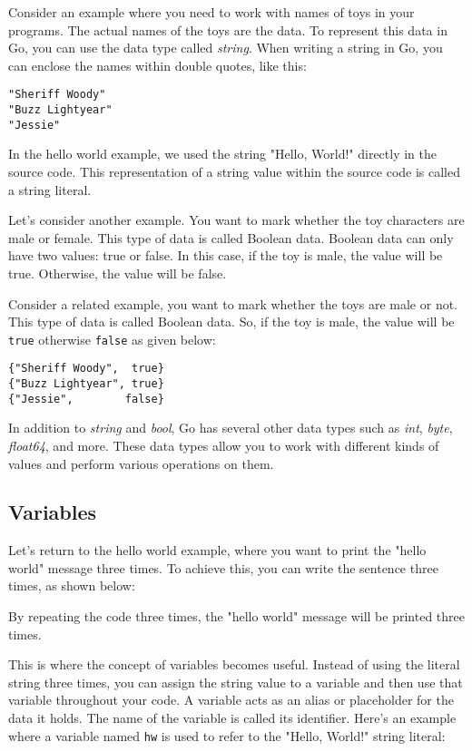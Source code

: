 Consider an example where you need to work with names of toys in your programs.
The actual names of the toys are the data. To represent this data in Go, you can
use the data type called \textit{string}. When writing a string in Go, you can
enclose the names within double quotes, like this:

\begin{lstlisting}[numbers=none]
"Sheriff Woody"
"Buzz Lightyear"
"Jessie"
\end{lstlisting}

In the hello world example, we used the string "Hello, World!" directly in the
source code. This representation of a string value within the source code is
called a string literal.

Let's consider another example. You want to mark whether the toy characters are
male or female. This type of data is called Boolean data. Boolean data can only
have two values: true or false. In this case, if the toy is male, the value will
be true. Otherwise, the value will be false.

Consider a related example, you want to mark whether the toys are male
or not.  This type of data is called Boolean data.  So, if the toy is
male, the value will be \texttt{true} otherwise \texttt{false} as
given below:

\begin{lstlisting}[numbers=none]
{"Sheriff Woody",  true}
{"Buzz Lightyear", true}
{"Jessie",        false}
\end{lstlisting}

In addition to \textit{string} and \textit{bool}, Go has several other data
types such as \textit{int}, \textit{byte}, \textit{float64}, and more. These
data types allow you to work with different kinds of values and perform various
operations on them.

\subsection{Variables}

Let's return to the hello world example, where you want to print the "hello
world" message three times. To achieve this, you can write the sentence three
times, as shown below:



By repeating the code three times, the "hello world" message will be printed three times.

This is where the concept of variables becomes useful. Instead
of using the literal string three times, you can assign the string value to a
variable and then use that variable throughout your code. A variable acts as an
alias or placeholder for the data it holds. The name of the variable is called
its identifier. Here's an example where a variable named \texttt{hw} is used to
refer to the "Hello, World!" string literal:

